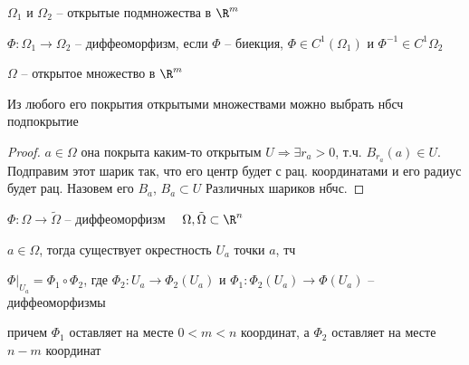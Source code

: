 
\begin{definition}\thmslashn 
	
	$\Omega_1$ и $\Omega_2$ -- открытые подмножества в $\R^m$
	
	$\Phi: \Omega_1\to\Omega_2$ -- диффеоморфизм, если $\Phi$ -- биекция, $\Phi \in C^1(\Omega_1)$ и $\Phi^{-1} \in C^1{\Omega_2}$
	
\end{definition}

\begin{theorem}[Линделефа]\thmslashn
	
	$\Omega$ -- открытое множество в $\R^m$
	
	Из любого его покрытия открытыми множествами можно выбрать нбсч подпокрытие
	
\end{theorem}

\begin{proof}\thmslashn
	
	$a\in \Omega$ она покрыта каким-то открытым $U \Rightarrow \exists r_a > 0$, т.ч. $B_{r_{a}}(a) \in U$. Подправим этот шарик так, что его центр будет с рац. координатами и его радиус будет рац. Назовем его $B_a$, $B_a \subset U$ Различных шариков нбчс. 
	
\end{proof}

\begin{lemma}\thmslashn
	
	$\Phi: \Omega\to\tilde{\Omega}$ -- диффеоморфизм $\quad \Omega, \tilde{\Omega} \subset \R^n$
	
	$a\in \Omega$, тогда существует окрестность $U_a$ точки $a$, тч 
	
	$\left.\Phi\right|_{U_a} = \Phi_1 \circ \Phi_2$, где $\Phi_2:U_a \to \Phi_2(U_a)$ и $\Phi_1:\Phi_2(U_a)\to\Phi(U_a)$ -- диффеоморфизмы
	
	причем $\Phi_1$ оставляет на месте $0 < m < n$ координат, а $\Phi_2$ оставляет на месте $n-m$ координат
	
\end{lemma}


